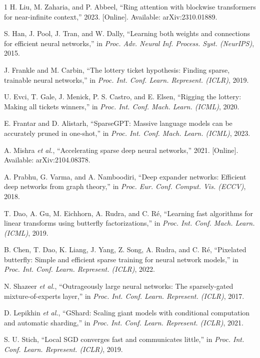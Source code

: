 \documentclass[10pt,journal]{IEEEtran}
\begin{document}
\begin{thebibliography}{1}
H. Liu, M. Zaharia, and P. Abbeel, ``Ring attention with blockwise transformers for
near-infinite context,'' 2023. [Online]. Available: arXiv:2310.01889.

S. Han, J. Pool, J. Tran, and W. Dally, ``Learning both weights and connections for efficient
neural networks,'' in \emph{Proc. Adv. Neural Inf. Process. Syst. (NeurIPS)}, 2015.

J. Frankle and M. Carbin, ``The lottery ticket hypothesis: Finding sparse, trainable neural
networks,'' in \emph{Proc. Int. Conf. Learn. Represent. (ICLR)}, 2019.

U. Evci, T. Gale, J. Menick, P. S. Castro, and E. Elsen, ``Rigging the lottery: Making all
tickets winners,'' in \emph{Proc. Int. Conf. Mach. Learn. (ICML)}, 2020.

E. Frantar and D. Alistarh, ``SparseGPT: Massive language models can be accurately pruned in
one-shot,'' in \emph{Proc. Int. Conf. Mach. Learn. (ICML)}, 2023.

A. Mishra \emph{et al.}, ``Accelerating sparse deep neural networks,'' 2021. [Online].
Available: arXiv:2104.08378.

A. Prabhu, G. Varma, and A. Namboodiri, ``Deep expander networks: Efficient deep networks from
graph theory,'' in \emph{Proc. Eur. Conf. Comput. Vis. (ECCV)}, 2018.

T. Dao, A. Gu, M. Eichhorn, A. Rudra, and C. Ré, ``Learning fast algorithms for linear
transforms using butterfly factorizations,'' in \emph{Proc. Int. Conf. Mach. Learn. (ICML)},
2019.

B. Chen, T. Dao, K. Liang, J. Yang, Z. Song, A. Rudra, and C. Ré, ``Pixelated butterfly:
Simple and efficient sparse training for neural network models,'' in \emph{Proc. Int. Conf.
Learn. Represent. (ICLR)}, 2022.

N. Shazeer \emph{et al.}, ``Outrageously large neural networks: The sparsely-gated
mixture-of-experts layer,'' in \emph{Proc. Int. Conf. Learn. Represent. (ICLR)}, 2017.

D. Lepikhin \emph{et al.}, ``GShard: Scaling giant models with conditional computation and
automatic sharding,'' in \emph{Proc. Int. Conf. Learn. Represent. (ICLR)}, 2021.

S. U. Stich, ``Local SGD converges fast and communicates little,'' in \emph{Proc. Int. Conf.
Learn. Represent. (ICLR)}, 2019.


\end{thebibliography}
\end{document}
